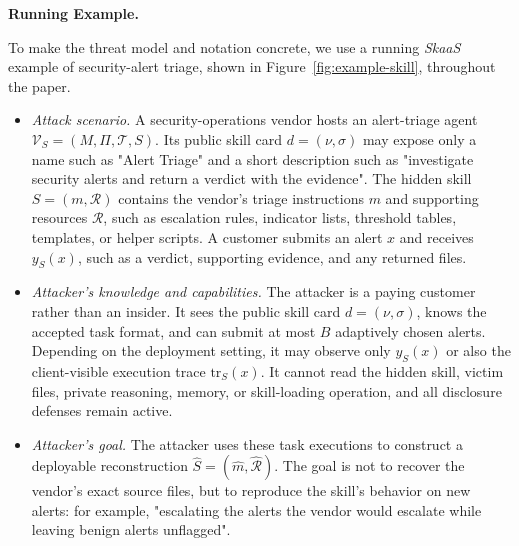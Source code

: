 \documentclass[letterpaper,twocolumn,10pt]{article}
\newcommand{\trace}{\mathrm{tr}}
\newcommand{\paragraphtitle}[1]{%
  \vspace{5pt}\noindent\textbf{#1.}%
}
\begin{document}
\paragraphtitle{Running Example}
To make the threat model and notation concrete, we use a running \textit{SkaaS} example of security-alert triage, shown in Figure~\ref{fig:example-skill}, throughout the paper.

\begin{itemize}

    \item \emph{Attack scenario.} A security-operations vendor hosts an alert-triage agent $\mathcal{V}_S=(M,\Pi,\mathcal{T},S)$. Its public skill card $d=(\nu,\sigma)$ may expose only a name such as "Alert Triage" and a short description such as "investigate security alerts and return a verdict with the evidence". The hidden skill $S=(m,\mathcal{R})$ contains the vendor’s triage instructions $m$ and supporting resources $\mathcal{R}$, such as escalation rules, indicator lists, threshold tables, templates, or helper scripts. A customer submits an alert $x$ and receives $y_S(x)$, such as a verdict, supporting evidence, and any returned files.
    \item \emph{Attacker’s knowledge and capabilities.} The attacker is a paying customer rather than an insider. It sees the public skill card $d=(\nu,\sigma)$, knows the accepted task format, and can submit at most $B$ adaptively chosen alerts. Depending on the deployment setting, it may observe only $y_S(x)$ or also the client-visible execution trace $\trace_S(x)$. It cannot read the hidden skill, victim files, private reasoning, memory, or skill-loading operation, and all disclosure defenses remain active.
    \item\emph{Attacker’s goal.} The attacker uses these task executions to construct a deployable reconstruction $\widehat{S}=(\widehat{m},\widehat{\mathcal{R}})$. The goal is not to recover the vendor’s exact source files, but to reproduce the skill’s behavior on new alerts: for example, "escalating the alerts the vendor would escalate while leaving benign alerts unflagged".
\end{itemize}

\end{document}
